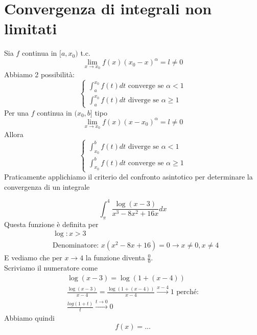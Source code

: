 \section{Convergenza di integrali non limitati}
Sia $f$ continua in $[a, x_0)$ t.c.
\begin{equation*}
    \lim_{x\to x_0}f(x)(x_0-x)^{\alpha}=l\not=0
\end{equation*}
Abbiamo 2 possibilità:
\begin{equation}
    \begin{cases}
        \int_{a}^{x_0} f(t) dt \text{ converge se }\alpha<1\\
        \int_{a}^{x_0} f(t) dt \text{ diverge se }\alpha \geq 1
    \end{cases}
\end{equation}
Per una $f$ continua in $(x_0, b]$ tipo
\begin{equation*}
    \lim_{x\to x_0}f(x)(x-x_0)^{\alpha}=l\not=0
\end{equation*}
Allora
\begin{equation}
    \begin{cases}
        \int_{x_0}^{b} f(t) dt \text{ diverge se }\alpha<1\\
        \int_{x_0}^{b} f(t) dt \text{ converge se }\alpha \geq 1
    \end{cases}
\end{equation}
Praticamente applichiamo il criterio del confronto asintotico per determinare la convergenza di un integrale

\begin{esempio}
    \begin{equation*}
        \int_{\pi}^{4} \frac{\log(x-3)}{x^3-8x^2+16x} dx
    \end{equation*}
    Questa funzione è definita per
    \begin{align*}
        &\log: x>3 \\
        &\text{Denominatore: } x(x^2-8x+16) = 0 \to x \not= 0, x \not= 4
    \end{align*}
    E vediamo che per $x\to4$ la funzione diventa $\frac{0}{0}$.\\
    Scriviamo il numeratore come
    \begin{gather*}
        \log(x-3)=\log(1+(x-4)) \\
        \frac{\log(x-3)}{x-4}= \frac{\log(1+(x-4))}{x-4} \xrightarrow{x-4} 1 \text{   perché:}\\
        \frac{log(1+t)}{t} \xrightarrow{t\to0}0
    \end{gather*}
    Abbiamo quindi
    \begin{equation*}
        f(x) = ...
    \end{equation*}
\end{esempio}

